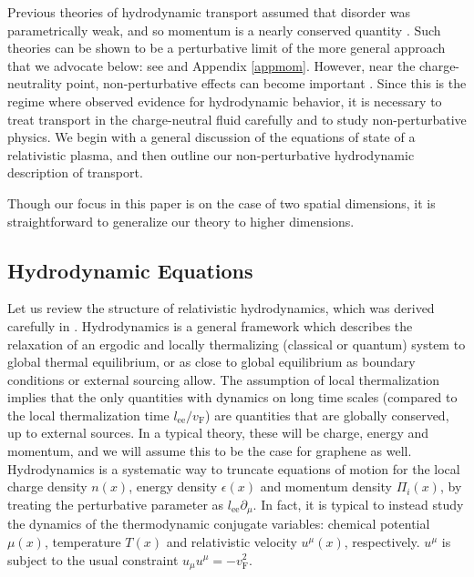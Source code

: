 \documentclass[10pt, oneside]{book}
\begin{document}
\begin{doublespace}
Previous theories of hydrodynamic transport assumed that disorder was parametrically weak, and so momentum is a nearly conserved quantity \cite{hkms, muller1}.    Such theories can be shown to be a perturbative limit of the more general approach that we advocate below: see \cite{Lucas:2015lna} and Appendix \ref{appmom}.    However, near the charge-neutrality point, non-perturbative effects can become important \cite{Lucas:2015lna}.  Since this is the regime where \cite{Crossno1058} observed evidence for hydrodynamic behavior, it is necessary to treat transport in the charge-neutral fluid carefully and to study non-perturbative physics.   We begin with a general discussion of the equations of state of a relativistic plasma, and then outline our non-perturbative hydrodynamic description of  transport.

Though our focus in this paper is on the case of two spatial dimensions, it is straightforward to generalize our theory to higher dimensions.


\subsection{Hydrodynamic Equations}
Let us review the structure of relativistic hydrodynamics, which was derived carefully in \cite{hkms}.  Hydrodynamics is a general framework which describes the relaxation of an ergodic and locally thermalizing (classical or quantum) system  to global thermal equilibrium, or as close to global equilibrium as boundary conditions or external sourcing allow.
The assumption of local thermalization implies that the only quantities with dynamics on long time scales (compared to the local thermalization time $l_{\mathrm{ee}}/v_{\mathrm{F}}$)  are quantities that are globally conserved, up to external sources.    In a typical theory, these will be charge, energy and momentum, and we will assume this to be the case for graphene as well.   
Hydrodynamics is a systematic way to truncate equations of motion for the local charge density $n(x)$,   energy density $\epsilon(x)$ and momentum density $\Pi_i(x)$, by treating the perturbative parameter as $l_{\mathrm{ee}} \partial_\mu$.    In fact, it is typical to instead study the dynamics of the thermodynamic conjugate variables: chemical potential $\mu(x)$, temperature $T(x)$ and relativistic velocity $u^\mu(x)$, respectively.  $u^\mu$ is subject to the usual constraint $u_\mu u^\mu = -v_{\mathrm{F}}^2$.


\end{doublespace}
\end{document}
